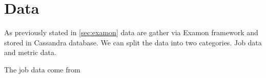 \section{Data}
\label{sec:data}

As previously stated in \ref{sec:examon} data are gather via Examon framework and stored in Cassandra database. We can split the data into two categories. Job data and metric data.

The job data come from 

